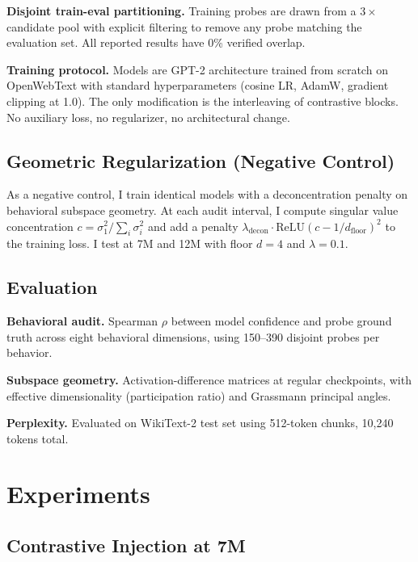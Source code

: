 \documentclass[11pt]{article}
\begin{document}
\textbf{Disjoint train-eval partitioning.} Training probes are drawn from a $3\times$ candidate pool with explicit filtering to remove any probe matching the evaluation set. All reported results have 0\% verified overlap.

\textbf{Training protocol.} Models are GPT-2 architecture trained from scratch on OpenWebText with standard hyperparameters (cosine LR, AdamW, gradient clipping at 1.0). The only modification is the interleaving of contrastive blocks. No auxiliary loss, no regularizer, no architectural change.

\subsection{Geometric Regularization (Negative Control)}

As a negative control, I train identical models with a deconcentration penalty on behavioral subspace geometry. At each audit interval, I compute singular value concentration $c = \sigma_1^2 / \sum_i \sigma_i^2$ and add a penalty $\lambda_{\text{decon}} \cdot \text{ReLU}(c - 1/d_{\text{floor}})^2$ to the training loss. I test at 7M and 12M with floor $d = 4$ and $\lambda = 0.1$.

\subsection{Evaluation}

\textbf{Behavioral audit.} Spearman $\rho$ between model confidence and probe ground truth across eight behavioral dimensions, using 150--390 disjoint probes per behavior.

\textbf{Subspace geometry.} Activation-difference matrices at regular checkpoints, with effective dimensionality (participation ratio) and Grassmann principal angles.

\textbf{Perplexity.} Evaluated on WikiText-2 test set using 512-token chunks, 10{,}240 tokens total.


\section{Experiments}

\subsection{Contrastive Injection at 7M}
\end{document}
